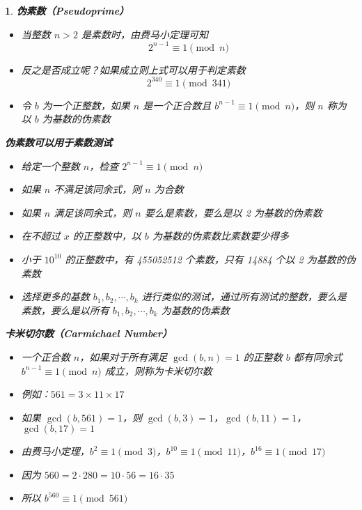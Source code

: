 \documentclass[UTF8]{report}
\theoremstyle{MyLineTheoremStyle} %
\theoremstyle{MyBlockTheoremStyle} %
\theoremstyle{MySubsubsectionStyle} %
\newtheorem{definition}{}
\begin{document}
\begin{definition}
    \textbf{伪素数（Pseudoprime）}
    \begin{itemize}
        \item 当整数 $n > 2$ 是素数时，由费马小定理可知
        \[
        2^{n-1} \equiv 1 \pmod{n}
        \]
        \item 反之是否成立呢？如果成立则上式可以用于判定素数
        \[
        2^{340} \equiv 1 \pmod{341}
        \]
        \item 令 $b$ 为一个正整数，如果 $n$ 是一个正合数且 $b^{n-1} \equiv 1 \pmod{n}$，则 $n$ 称为以 $b$ 为基数的伪素数
    \end{itemize}

    \textbf{伪素数可以用于素数测试}
    \begin{itemize}
        \item 给定一个整数 $n$，检查 $2^{n-1} \equiv 1 \pmod{n}$
        \item 如果 $n$ 不满足该同余式，则 $n$ 为合数
        \item 如果 $n$ 满足该同余式，则 $n$ 要么是素数，要么是以 2 为基数的伪素数
        \item 在不超过 $x$ 的正整数中，以 $b$ 为基数的伪素数比素数要少得多
        \item 小于 $10^{10}$ 的正整数中，有 455052512 个素数，只有 14884 个以 2 为基数的伪素数
        \item 选择更多的基数 $b_1, b_2, \cdots, b_k$ 进行类似的测试，通过所有测试的整数，要么是素数，要么是以所有 $b_1, b_2, \cdots, b_k$ 为基数的伪素数
    \end{itemize}

    \textbf{卡米切尔数（Carmichael Number）}
    \begin{itemize}
        \item 一个正合数 $n$，如果对于所有满足 $\gcd(b, n) = 1$ 的正整数 $b$ 都有同余式 $b^{n-1} \equiv 1 \pmod{n}$ 成立，则称为卡米切尔数
        \item 例如：$561 = 3 \times 11 \times 17$
        \item 如果 $\gcd(b, 561) = 1$，则 $\gcd(b, 3) = 1$，$\gcd(b, 11) = 1$，$\gcd(b, 17) = 1$
        \item 由费马小定理，$b^2 \equiv 1 \pmod{3}$，$b^{10} \equiv 1 \pmod{11}$，$b^{16} \equiv 1 \pmod{17}$
        \item 因为 $560 = 2 \cdot 280 = 10 \cdot 56 = 16 \cdot 35$
        \item 所以 $b^{560} \equiv 1 \pmod{561}$
    \end{itemize}


\end{definition}
\end{document}

